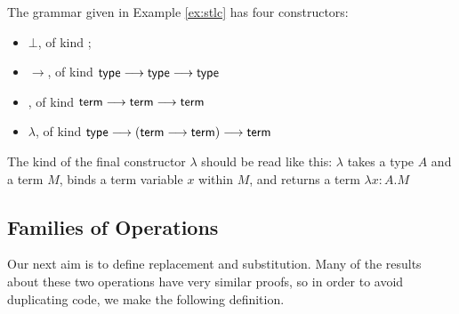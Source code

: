 \documentclass[envcountsame]{llncs}
\begin{document}
  
\begin{example}
The grammar given in Example \ref{ex:stlc} has four constructors:
\begin{itemize}
 \item
$\bot$, of kind ;
\item
$\rightarrow$, of kind $\AgdaFunction{type} \longrightarrow \AgdaFunction{type} \longrightarrow \AgdaFunction{type}$
\item
{}, of kind $\AgdaFunction{term} \longrightarrow \AgdaFunction{term} \longrightarrow \AgdaFunction{term}$
\item
$\lambda$, of kind $\AgdaFunction{type} \longrightarrow (\AgdaFunction{term} \longrightarrow \AgdaFunction{term}) \longrightarrow \AgdaFunction{term}$
\end{itemize}
The kind of the final constructor $\lambda$ should be read like this: $\lambda$ takes a type $A$
and a term $M$, binds a term variable $x$ within $M$, and returns a term $\lambda x:A.M$

\end{example}

\subsection{Families of Operations}

Our next aim is to define replacement and substitution.  Many of the results about these two operations have very similar proofs, so in order to avoid duplicating
code, we make the following definition.
\end{document}
